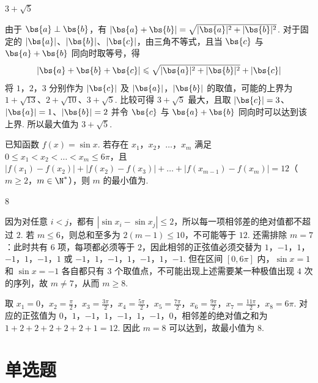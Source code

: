 \begin{answer}
\(3+\sqrt{5}\)
\end{answer}

\begin{solution}
由于 \(\bs{a}\perp\bs{b}\)，有 \(|\bs{a}+\bs{b}|=\sqrt{|\bs{a}|^2+|\bs{b}|^2}\). 对于固定的 \(|\bs{a}|\)、\(|\bs{b}|\)、\(|\bs{c}|\)，由三角不等式，且当 \(\bs{c}\) 与 \(\bs{a}+\bs{b}\) 同向时取等号，得
\[
|\bs{a}+\bs{b}+\bs{c}|\leqslant\sqrt{|\bs{a}|^2+|\bs{b}|^2}+|\bs{c}|
\]
将 \(1\)，\(2\)，\(3\) 分别作为 \(|\bs{c}|\) 及 \(|\bs{a}|\)，\(|\bs{b}|\) 的取值，可能的上界为 \(1+\sqrt{13}\)、\(2+\sqrt{10}\)、\(3+\sqrt5\). 比较可得 \(3+\sqrt5\) 最大，且取 \(|\bs{c}|=3\)、\(|\bs{a}|=1\)、\(|\bs{b}|=2\) 并令 \(\bs{c}\) 与 \(\bs{a}+\bs{b}\) 同向时可以达到该上界. 所以最大值为 \(3+\sqrt5\).
\end{solution}

\begin{problem}
已知函数 \( f(x) = \sin x \). 若存在 \(x_1\)，\(x_2\)，\(\dots\)，\(x_m\) 满足 \( 0 \leqslant x_1 < x_2 < \dots < x_m \leqslant 6\pi \)，且 \(|f(x_1) - f(x_2)| + |f(x_2) - f(x_3)| + \dots + |f(x_{m-1}) - f(x_m)| = 12\)（\(m \geqslant 2\)，\(m \in \N^*\)），则 \( m \) 的最小值为\fillinblank{}.
\end{problem}

\begin{answer}
8
\end{answer}

\begin{solution}
因为对任意 \(i<j\)，都有 \(|\sin x_i-\sin x_j|\leqslant2\)，所以每一项相邻差的绝对值都不超过 \(2\). 若 \(m\leqslant6\)，则总和至多为 \(2(m-1)\leqslant10\)，不可能等于 \(12\). 还需排除 \(m=7\)：此时共有 \(6\) 项，每项都必须等于 \(2\)，因此相邻的正弦值必须交替为 \(1\)，\(-1\)，\(1\)，\(-1\)，\(1\)，\(-1\)，\(1\) 或 \(-1\)，\(1\)，\(-1\)，\(1\)，\(-1\)，\(1\)，\(-1\). 但在区间 \([0,6\pi]\) 内，\(\sin x=1\) 和 \(\sin x=-1\) 各自都只有 \(3\) 个取值点，不可能出现上述需要某一种极值出现 \(4\) 次的序列，故 \(m\neq7\)，从而 \(m\geqslant8\).

取
\(x_1=0\)，\(x_2=\frac\pi2\)，\(x_3=\frac{3\pi}{2}\)，\(x_4=\frac{5\pi}{2}\)，\(x_5=\frac{7\pi}{2}\)，\(x_6=\frac{9\pi}{2}\)，\(x_7=\frac{11\pi}{2}\)，\(x_8=6\pi\).
对应的正弦值为 \(0\)，\(1\)，\(-1\)，\(1\)，\(-1\)，\(1\)，\(-1\)，\(0\)，相邻差的绝对值之和为 \(1+2+2+2+2+2+1=12\). 因此 \(m=8\) 可以达到，故最小值为 \(8\).
\end{solution}

\section{单选题}

